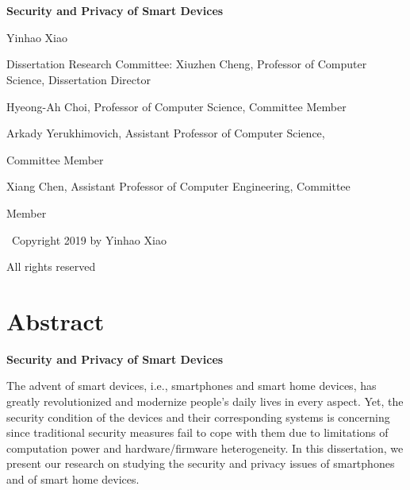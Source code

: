 \documentclass[letterpaper,12pt]{article}
\begin{document}
~\\
~\\
\centerline{\bf{Security and Privacy of Smart Devices}}

\centerline{Yinhao Xiao}

\vspace*{50px}

\hspace*{-18px}
Dissertation Research Committee:
   \singlespacing
\hspace{50px} Xiuzhen Cheng, Professor of Computer Science,
Dissertation Director

\vspace*{20px}

\hspace{50px} Hyeong-Ah Choi, Professor of Computer Science,
Committee Member

\vspace*{20px}

\hspace{50px} Arkady Yerukhimovich, Assistant Professor of Computer Science,

\hspace{50px} Committee Member

\vspace*{20px}

\hspace{50px} Xiang Chen, Assistant Professor of Computer Engineering,
Committee

\hspace{50px} Member

	\newpage
   \singlespacing
\vspace*{220px}%

\hspace{120px}
\textcopyright  ~Copyright 2019 by Yinhao Xiao



\hspace{156px}
All rights reserved



\newpage
\doublespacing
        \section{Abstract}

      \centerline{\bf{Security and Privacy of Smart Devices}}
\vspace*{10px}   

   The advent of smart devices, i.e., smartphones and smart home devices, has greatly revolutionized and modernize people's daily lives in every aspect. Yet, the security condition of the devices and their corresponding systems is concerning since traditional security measures fail to cope with them due to limitations of computation power and hardware/firmware heterogeneity. In this dissertation, we present our research on studying the security and privacy issues of smartphones and of smart home devices.
   
\end{document}
